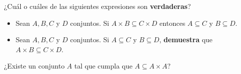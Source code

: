 \documentclass[oneside]{style}
\begin{document}
\begin{questions}[label=\protect\circled{\bfseries\arabic*}]
    \question
    {
        ¿Cuál o cuáles de las siguientes expresiones son \textbf{verdaderas}?
        \begin{itemize}
            \item Sean $A,B,C$ y $D$ conjuntos. Si $A \times B \subseteq 
            C \times D$ entonces $A \subseteq C$ y $B \subseteq D$. 

            \item Sean $A,B,C$ y $D$ conjuntos. Si $A \subseteq C$ y 
            $B \subseteq D$, \textbf{demuestra} que $A \times B \subseteq 
            C \times D$. 
        \end{itemize} 
    }

    \question
    {
        ¿Existe un conjunto $A$ tal que cumpla que $A \subseteq A \times A$?
    }

\end{questions}
\end{document}
